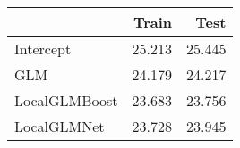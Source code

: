 \begin{tabular}{lrr}
\toprule
{} &   Train &    Test \\
\midrule
Intercept     &  25.213 &  25.445 \\
GLM           &  24.179 &  24.217 \\
LocalGLMBoost &  23.683 &  23.756 \\
LocalGLMNet   &  23.728 &  23.945 \\
\bottomrule
\end{tabular}
